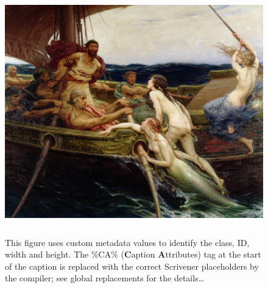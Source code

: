 \documentclass[
  12pt,
  a4paper,
  oneside,
  titlepage,
  toclink=all,
  toc=bibliography]{scrbook}
\theoremstyle{definition}
\theoremstyle{plain}
\theoremstyle{plain}
\theoremstyle{plain}
\theoremstyle{plain}
\theoremstyle{definition}
\theoremstyle{definition}
\theoremstyle{plain}
\theoremstyle{remark}
\begin{document}
\begin{figure}

{\centering \includegraphics[width=5.0625in,height=4.1875in]{Ulysses1.jpg}

}

\caption{\label{fig-scriv24}This figure uses custom metadata values to
identify the class, ID, width and height. The \%CA\%\hspace{0pt}
(\textbf{C}aption \textbf{A}ttributes) tag at the start of the caption
is replaced with the correct Scrivener placeholders by the compiler; see
global replacements for the details\ldots{}}

\end{figure}
\end{document}
